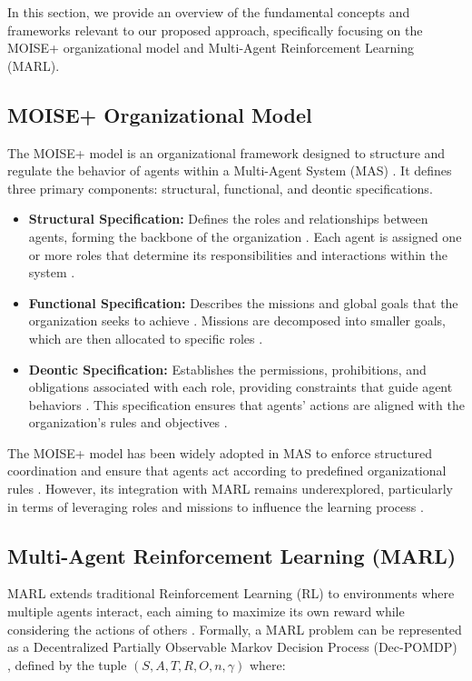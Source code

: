 \documentclass[sigconf,anonymous]{aamas}
\begin{document}
In this section, we provide an overview of the fundamental concepts and frameworks relevant to our proposed approach, specifically focusing on the MOISE+ organizational model and Multi-Agent Reinforcement Learning (MARL).

\subsection{MOISE+ Organizational Model}
The MOISE+ model \cite{hubner2010moise} is an organizational framework designed to structure and regulate the behavior of agents within a Multi-Agent System (MAS) \cite{hubner2007using}. It defines three primary components: structural, functional, and deontic specifications.

\begin{itemize}
    \item \textbf{Structural Specification:} Defines the roles and relationships between agents, forming the backbone of the organization \cite{hubner2010moise}. Each agent is assigned one or more roles that determine its responsibilities and interactions within the system \cite{castaneda2019policy}.
    \item \textbf{Functional Specification:} Describes the missions and global goals that the organization seeks to achieve \cite{hubner2010moise}. Missions are decomposed into smaller goals, which are then allocated to specific roles \cite{hernandez2019survey}.
    \item \textbf{Deontic Specification:} Establishes the permissions, prohibitions, and obligations associated with each role, providing constraints that guide agent behaviors \cite{hubner2007using}. This specification ensures that agents' actions are aligned with the organization's rules and objectives \cite{hubner2010moise}.
\end{itemize}

The MOISE+ model has been widely adopted in MAS to enforce structured coordination and ensure that agents act according to predefined organizational rules \cite{hubner2007using}. However, its integration with MARL remains underexplored, particularly in terms of leveraging roles and missions to influence the learning process \cite{hernandez2019survey, soule2024}.

\subsection{Multi-Agent Reinforcement Learning (MARL)}
MARL extends traditional Reinforcement Learning (RL) to environments where multiple agents interact, each aiming to maximize its own reward while considering the actions of others \cite{foerster2016learning, lowe2017multi}. Formally, a MARL problem can be represented as a Decentralized Partially Observable Markov Decision Process (Dec-POMDP) \cite{oliehoek2016concise}, defined by the tuple $(S, A, T, R, O, n, \gamma)$ where:
\end{document}
